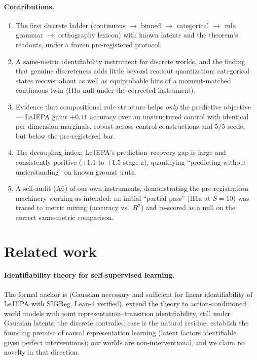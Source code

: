 \documentclass[11pt]{article}
\begin{document}
\paragraph{Contributions.}
\begin{enumerate}[leftmargin=*,itemsep=1pt]
\item The first discrete ladder (continuous $\to$ binned $\to$ categorical
$\to$ rule grammar $\to$ orthography lexicon) with known latents and the
theorem's readouts, under a frozen pre-registered protocol.
\item A same-metric identifiability instrument for discrete worlds, and the
finding that genuine discreteness adds little beyond readout quantization:
categorical states recover about as well as equiprobable bins of a
moment-matched continuous twin (H1a null under the corrected instrument).
\item Evidence that compositional rule structure helps \emph{only} the
predictive objective --- LeJEPA gains $+0.11$ accuracy over an unstructured
control with identical per-dimension marginals, robust across control
constructions and 5/5 seeds, but below the pre-registered bar.
\item The decoupling index: LeJEPA's prediction--recovery gap is large and
consistently positive ($+1.1$ to $+1.5$ stage-z), quantifying
``predicting-without-understanding'' on known ground truth.
\item A self-audit (A6) of our own instruments, demonstrating the
pre-registration machinery working as intended: an initial ``partial pass''
(H1a at $S{=}10$) was traced to metric mixing (accuracy vs.\ $R^2$) and
re-scored as a null on the correct same-metric comparison.
\end{enumerate}

\section{Related work}
\label{sec:related}
\paragraph{Identifiability theory for self-supervised learning.}
The formal anchor is \citet{klindt2026lejepa} (Gaussian necessary and
sufficient for linear identifiability of LeJEPA with SIGReg, Lean-4 verified).
\citet{controlledWM2026} extend the theory to action-conditioned world models
with joint representation--transition identifiability, still under Gaussian
latents; the discrete controlled case is the natural residue.
\citet{interventionalCRL2022} establish the founding premise of causal
representation learning (latent factors identifiable given perfect
interventions); our worlds are non-interventional, and we claim no novelty in
that direction.
\end{document}

